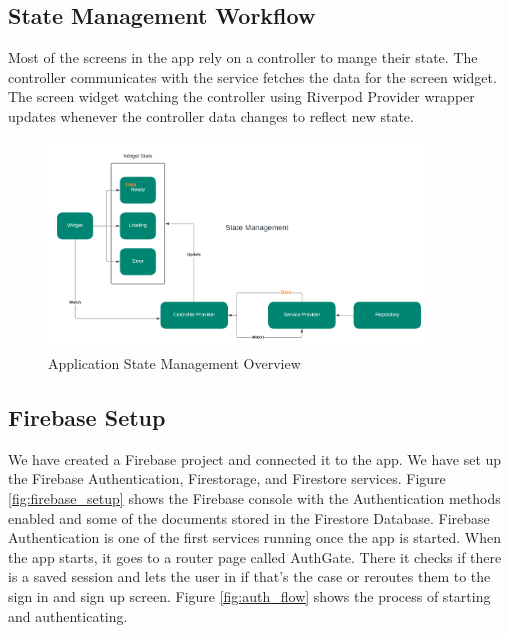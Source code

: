 \documentclass[a4paper, 12pt]{report} %
\begin{document}
        \FloatBarrier

        \subsection*{State Management Workflow}
        Most of the screens in the app rely on a controller to mange their state. The controller communicates with the service fetches the data for the screen widget. The screen widget watching the controller using Riverpod Provider wrapper updates whenever the controller data changes to reflect new state. 

        \begin{figure}[H]
            \centering
            \includegraphics[width=0.9\textwidth]{Images/state_management.png}
            \caption{Application State Management Overview}
            \label{fig:state_management}
        \end{figure}


        \pagebreak
        \subsection{Firebase Setup}
            We have created a Firebase project and connected it to the app. We have set up the Firebase Authentication, Firestorage, and Firestore services. Figure \ref{fig:firebase_setup} shows the Firebase console with the Authentication methods enabled and some of the documents stored in the Firestore Database. Firebase Authentication is one of the first services running once the app is started. When the app starts, it goes to a router page called AuthGate. There it checks if there is a saved session and lets the user in if that's the case or reroutes them to the sign in and sign up screen. Figure \ref{fig:auth_flow} shows the process of starting and authenticating.
\end{document}
